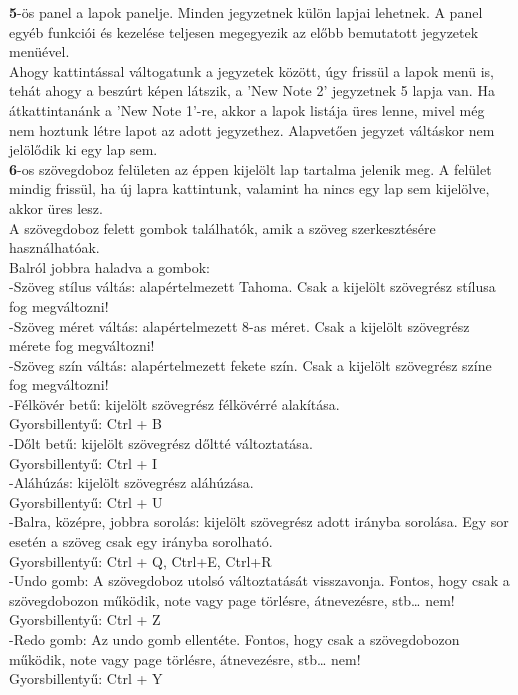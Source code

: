 \vspace{5pt} \noindent \textbf{5}-ös panel a lapok panelje. Minden jegyzetnek külön lapjai lehetnek. A panel egyéb funkciói és kezelése teljesen megegyezik az előbb bemutatott jegyzetek menüével.
\vspace{5pt} \\ Ahogy kattintással váltogatunk a jegyzetek között, úgy frissül a lapok menü is, tehát ahogy a beszúrt képen látszik, a ’New Note 2’ jegyzetnek 5 lapja van. Ha átkattintanánk a ’New Note 1’-re, akkor a lapok listája üres lenne, mivel még nem hoztunk létre lapot az adott jegyzethez. Alapvetően jegyzet váltáskor nem jelölődik ki egy lap sem. 
\vspace{10pt} \\ \textbf{6}-os szövegdoboz felületen az éppen kijelölt lap tartalma jelenik meg. A felület mindig frissül, ha új lapra kattintunk, valamint ha nincs egy lap sem kijelölve, akkor üres lesz.
\\A szövegdoboz felett gombok találhatók, amik a szöveg szerkesztésére használhatóak.
\\Balról  jobbra haladva a gombok: 
\vspace{5pt} \\-Szöveg stílus váltás: alapértelmezett Tahoma. Csak a kijelölt szövegrész stílusa fog megváltozni!
\vspace{5pt} \\-Szöveg méret váltás: alapértelmezett 8-as méret. Csak a kijelölt szövegrész mérete fog megváltozni!
\vspace{5pt} \\-Szöveg szín váltás: alapértelmezett fekete szín. Csak a kijelölt szövegrész színe fog megváltozni!
\vspace{5pt} \\-Félkövér betű: kijelölt szövegrész félkövérré alakítása.
\\Gyorsbillentyű: Ctrl + B
\vspace{5pt} \\-Dőlt betű: kijelölt szövegrész dőltté változtatása.
\\Gyorsbillentyű: Ctrl + I
\vspace{5pt} \\-Aláhúzás: kijelölt szövegrész aláhúzása.
\\Gyorsbillentyű: Ctrl + U
\vspace{5pt} \\-Balra, középre, jobbra sorolás: kijelölt szövegrész adott irányba sorolása. Egy sor esetén a szöveg csak egy irányba sorolható.
\\Gyorsbillentyű: Ctrl + Q, Ctrl+E, Ctrl+R
\vspace{5pt} \\-Undo gomb: A szövegdoboz utolsó változtatását visszavonja. Fontos, hogy csak a szövegdobozon működik, note vagy page törlésre, átnevezésre, stb… nem!
\\Gyorsbillentyű: Ctrl + Z
\vspace{5pt} \\-Redo gomb: Az undo gomb ellentéte. Fontos, hogy csak a szövegdobozon működik, note vagy page törlésre, átnevezésre, stb… nem!
\\Gyorsbillentyű: Ctrl + Y

